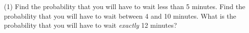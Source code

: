 \documentclass[../mathNotesPreamble]{subfiles}
\begin{document}
  \begin{extasks}[after-item-skip=\stretch{1}](1)
    \task Find the probability that you will have to wait less than 5 minutes.
    \task Find the probability that you will have to wait between 4 and 10 minutes.
    \task What is the probability that you will have to wait \emph{exactly} 12 minutes?
  \end{extasks}
  \pagebreak


  \pagebreak
\end{document}
